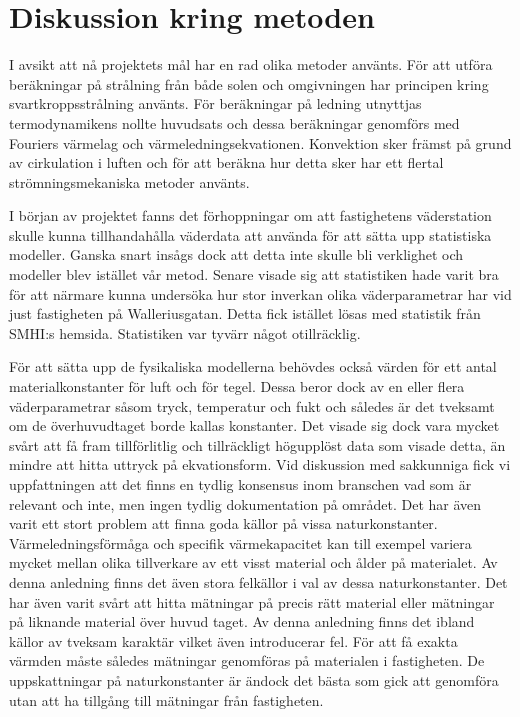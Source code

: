 \section{Diskussion kring metoden}\label{sec:discmethod}

I avsikt att nå projektets mål har en rad olika metoder använts. För att utföra beräkningar på strålning från både solen och
omgivningen har principen kring svartkroppsstrålning använts. För beräkningar på ledning utnyttjas termodynamikens nollte huvudsats
och dessa beräkningar genomförs med Fouriers värmelag och värmeledningsekvationen. Konvektion sker främst på grund av cirkulation i luften och för att beräkna hur
detta sker har ett flertal strömningsmekaniska metoder använts.

I början av projektet fanns det förhoppningar om att fastighetens väderstation skulle kunna tillhandahålla väderdata att använda för att sätta upp statistiska modeller. 
Ganska snart insågs dock att detta inte skulle bli verklighet och modeller blev istället vår metod. Senare visade sig att statistiken hade
varit bra för att närmare kunna undersöka hur stor inverkan olika väderparametrar har vid just fastigheten på Walleriusgatan. 
Detta fick istället lösas med statistik från SMHI:s hemsida. Statistiken var tyvärr något otillräcklig.

För att sätta upp de fysikaliska modellerna behövdes också värden för ett antal materialkonstanter för luft och för tegel. 
Dessa beror dock av en eller flera väderparametrar såsom tryck, temperatur och fukt och således är det tveksamt om de överhuvudtaget borde kallas konstanter. 
Det visade sig dock vara mycket svårt att få fram tillförlitlig och tillräckligt högupplöst data som visade detta, än mindre att hitta uttryck på ekvationsform.
Vid diskussion med sakkunniga fick vi uppfattningen att det finns en tydlig konsensus inom branschen vad som är relevant och inte, men ingen tydlig dokumentation på området.
Det har även varit ett stort problem att finna goda källor på vissa naturkonstanter. Värmeledningsförmåga och specifik värmekapacitet kan till exempel
variera mycket mellan olika tillverkare av ett visst material och ålder på materialet. Av denna anledning finns det även stora felkällor i val av dessa naturkonstanter. Det har även
varit svårt att hitta mätningar på precis rätt material eller mätningar på liknande material över huvud taget. Av denna anledning finns det ibland
källor av tveksam karaktär vilket även introducerar fel. För att få exakta värmden måste således mätningar genomföras på materialen i fastigheten. De uppskattningar
på naturkonstanter är ändock det bästa som gick att genomföra utan att ha tillgång till mätningar från fastigheten.

